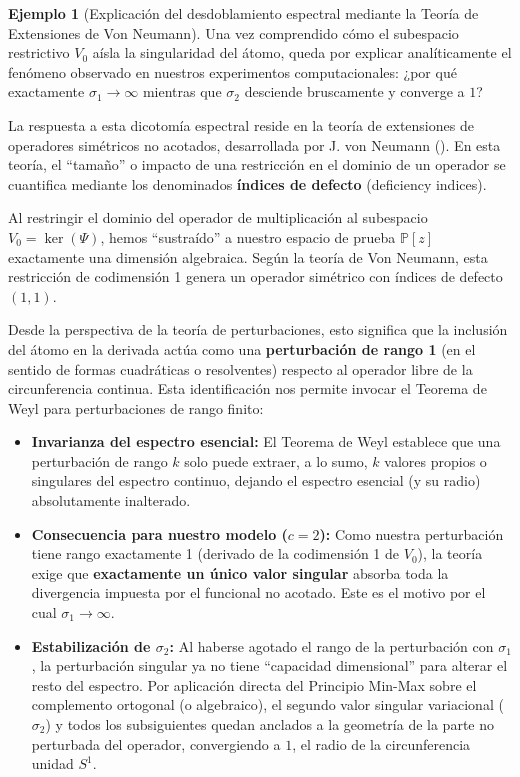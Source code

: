 \documentclass[12pt,a4paper]{article}
\theoremstyle{definition}
\newtheorem{ejemplo}{Ejemplo}
\theoremstyle{remark}
\begin{document}
\begin{ejemplo}[Explicación del desdoblamiento espectral mediante la Teoría de Extensiones de Von Neumann]
    Una vez comprendido cómo el subespacio restrictivo $V_0$ aísla la singularidad del átomo, queda por explicar analíticamente el fenómeno observado en nuestros experimentos computacionales: ¿por qué exactamente $\sigma_1 \to \infty$ mientras que $\sigma_2$ desciende bruscamente y converge a $1$?

    La respuesta a esta dicotomía espectral reside en la teoría de extensiones de operadores simétricos no acotados, desarrollada por J. von Neumann (\cite{reed1975methods}). En esta teoría, el ``tamaño'' o impacto de una restricción en el dominio de un operador se cuantifica mediante los denominados \textbf{índices de defecto} (deficiency indices).

    Al restringir el dominio del operador de multiplicación al subespacio $V_0 = \ker(\Psi)$, hemos ``sustraído'' a nuestro espacio de prueba $\mathbb{P}[z]$ exactamente una dimensión algebraica. Según la teoría de Von Neumann, esta restricción de codimensión 1 genera un operador simétrico con índices de defecto $(1,1)$.

    Desde la perspectiva de la teoría de perturbaciones, esto significa que la inclusión del átomo en la derivada actúa como una \textbf{perturbación de rango 1} (en el sentido de formas cuadráticas o resolventes) respecto al operador libre de la circunferencia continua. Esta identificación nos permite invocar el Teorema de Weyl para perturbaciones de rango finito:
    \begin{itemize}
        \item \textbf{Invarianza del espectro esencial:} El Teorema de Weyl establece que una perturbación de rango $k$ solo puede extraer, a lo sumo, $k$ valores propios o singulares del espectro continuo, dejando el espectro esencial (y su radio) absolutamente inalterado.
        \item \textbf{Consecuencia para nuestro modelo ($c=2$):} Como nuestra perturbación tiene rango exactamente 1 (derivado de la codimensión 1 de $V_0$), la teoría exige que \textbf{exactamente un único valor singular} absorba toda la divergencia impuesta por el funcional no acotado. Este es el motivo por el cual $\sigma_1 \to \infty$.
        \item \textbf{Estabilización de $\sigma_2$:} Al haberse agotado el rango de la perturbación con $\sigma_1$, la perturbación singular ya no tiene ``capacidad dimensional'' para alterar el resto del espectro. Por aplicación directa del Principio Min-Max sobre el complemento ortogonal (o algebraico), el segundo valor singular variacional ($\sigma_2$) y todos los subsiguientes quedan anclados a la geometría de la parte no perturbada del operador, convergiendo  a $1$, el radio de la circunferencia unidad $S^1$.
    \end{itemize}


\end{ejemplo}
\end{document}
